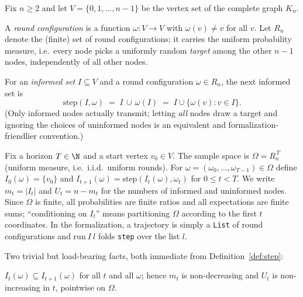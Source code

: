 Fix $n \ge 2$ and let $V = \{0,1,\dots,n-1\}$ be the vertex set of the
complete graph $K_n$.

\begin{definition}\label{def:round}
  \leanok
  A \emph{round configuration} is a function
  $\omega \colon V \to V$ with $\omega(v) \ne v$ for all $v$.
  Let $R_n$ denote the (finite) set of round configurations; it carries the
  uniform probability measure, i.e.\ every node picks a uniformly random
  \emph{target} among the other $n-1$ nodes, independently of all other
  nodes.
\end{definition}

\begin{definition}\label{def:step}
  \leanok
  For an \emph{informed set} $I \subseteq V$ and a round configuration
  $\omega \in R_n$, the next informed set is
  \[
    \mathrm{step}(I,\omega) \;=\; I \,\cup\, \omega(I)
    \;=\; I \cup \{\omega(v) : v \in I\}.
  \]
  (Only informed nodes actually transmit; letting \emph{all} nodes draw a
  target and ignoring the choices of uninformed nodes is an equivalent and
  formalization-friendlier convention.)
\end{definition}

\begin{definition}[Process]\label{def:process}
  \leanok
  Fix a horizon $T \in \N$ and a start vertex $v_0 \in V$. The sample space
  is $\Omega = R_n^{\,T}$ (uniform measure, i.e.\ i.i.d.\ uniform rounds).
  For $\omega = (\omega_0,\dots,\omega_{T-1}) \in \Omega$ define
  $I_0(\omega) = \{v_0\}$ and
  $I_{t+1}(\omega) = \mathrm{step}(I_t(\omega), \omega_t)$ for $0 \le t < T$.
  We write $m_t = |I_t|$ and $U_t = n - m_t$ for the numbers of informed and
  uninformed nodes. Since $\Omega$ is finite, all probabilities are finite
  ratios and all expectations are finite sums; ``conditioning on $I_t$''
  means partitioning $\Omega$ according to the first $t$ coordinates. In the
  formalization, a trajectory is simply a \texttt{List} of round
  configurations and $\mathrm{run}\ I\ l$ folds \texttt{step} over the list
  $l$.
\end{definition}

Two trivial but load-bearing facts, both immediate from
Definition~\ref{def:step}:

\begin{lemma}[Monotonicity]\label{lem:mono}
  \leanok
  $I_t(\omega) \subseteq I_{t+1}(\omega)$ for all $t$ and all $\omega$;
  hence $m_t$ is non-decreasing and $U_t$ is non-increasing in $t$,
  pointwise on $\Omega$.
\end{lemma}

